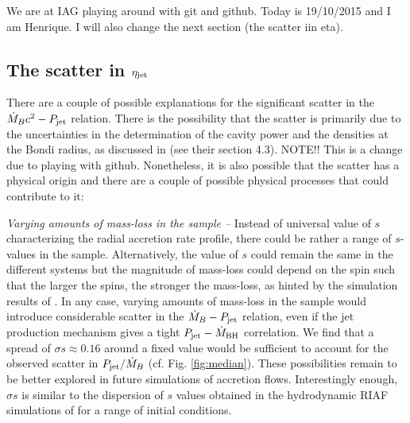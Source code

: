 \documentclass[useAMS,usenatbib]{mn2e}
\begin{document}
We are at IAG playing around with git and github. Today is 19/10/2015 and I am Henrique. I will also change the next section (the scatter iin eta).



\subsection{The scatter in $\eta_{\rm jet}$}

There are a couple of possible explanations for the significant scatter in the $\dot{M}_B c^2 - P_{\rm jet}$ relation. There is the possibility that the scatter is primarily due to the uncertainties in the determination of the cavity power and the densities at the Bondi radius, as discussed in \cite{Russell13} (see their section 4.3). NOTE!! This is a change due to playing with github. Nonetheless, it is also possible that the scatter has a physical origin and there are a couple of possible physical processes that could contribute to it: 

\vspace{0.2cm}
\noindent
{\it Varying amounts of mass-loss in the sample --}
Instead of universal value of $s$ characterizing the radial accretion rate profile, there could be rather a range of $s$-values in the sample. Alternatively, the value of $s$ could remain the same in the different systems but the magnitude of mass-loss could depend on the spin such that the larger the spins, the stronger the mass-loss, as hinted by the simulation results of \cite{Sadowski13sim}.  In any case, varying amounts of mass-loss in the sample would introduce considerable scatter in the $\dot{M}_B - P_{\rm jet}$ relation, even if the jet production mechanism gives a tight $P_{\rm jet} - \dot{M}_{\rm BH}$ correlation. We find that a spread of $\sigma s \approx 0.16$ around a fixed value would be sufficient to account for the observed scatter in $P_{\rm jet}/\dot{M}_B$ (cf. Fig. \ref{fig:median}). These possibilities remain to be better explored in future simulations of accretion flows. Interestingly enough, $\sigma s$ is similar to the dispersion of $s$ values obtained in the hydrodynamic RIAF simulations of \cite{Yuan12,Bu13} for a range of initial conditions. 
\end{document}

